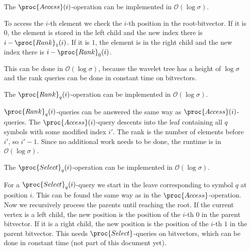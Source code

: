 \begin{Theorem}
  \label{thm:waveletTreeAceess}
  The $\proc{Access}(i)$-operation can be implemented in $\mathcal{O}(\log \sigma)$.
\end{Theorem}

\begin{Proof}
  To access the $i$-th element we check the $i$-th position in the root-bitvector. If it is $0$, the element is stored in the left child and the new index there is $i - \proc{Rank}_1(i)$. If it is $1$, the element is in the right child and the new index there is $i - \proc{Rank}_0(i)$.

  This can be done in $\mathcal{O}(\log\sigma)$, because the wavelet tree has a height of $\log\sigma$ and the rank queries can be done in constant time on bitvectors.
\end{Proof}

\begin{Theorem}
  \label{thm:waveletTreeRank}
  The $\proc{Rank}_q(i)$-operation can be implemented in $\mathcal{O}(\log \sigma)$.
\end{Theorem}

\begin{Proof}
  $\proc{Rank}_q(i)$-queries can be answered the same way as $\proc{Access}(i)$-queries. The $\proc{Access}(i)$-query descents into the leaf containing all $q$ symbols with some modified index $i'$. The rank is the number of elements before $i'$, so $i'-1$. Since no additional work needs to be done, the runtime is in $\mathcal{O}(\log\sigma)$.
\end{Proof}

\begin{Theorem}
  \label{thm:waveletTreeSelect}
  The $\proc{Select}_q(i)$-operation can be implemented in $\mathcal{O}(\log \sigma)$.
\end{Theorem}

\begin{Proof}
  For a $\proc{Select}_q(i)$-query we start in the leave corresponding to symbol $q$ at position $i$. This can be found the same way as in the $\proc{Access}$-operation. Now we recursively process the parents until reaching the root. If the current vertex is a left child, the new position is the position of the $i$-th $0$ in the parent bitvector. If it is a right child, the new position is the position of the $i$-th $1$ in the parent bitvector. This needs $\proc{Select}$-queries on bitvectors, which can be done in constant time (not part of this document yet).
\end{Proof}

